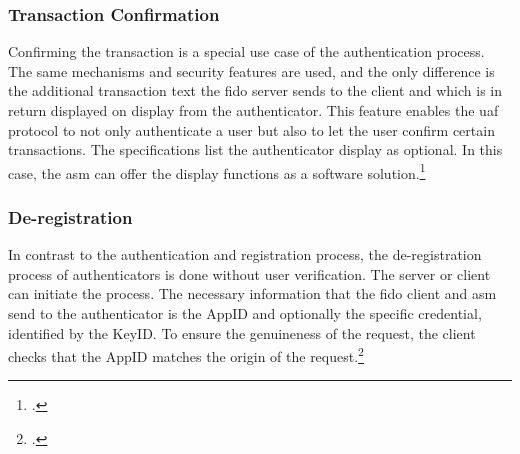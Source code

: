 \subsubsection{Transaction Confirmation}

Confirming the transaction is a special use case of the authentication process. The same mechanisms and security features are used, and the only difference is the additional transaction text the \gls{fido} server sends to the client and which is in return displayed on display from the authenticator. This feature enables the \gls{uaf} protocol to not only authenticate a user but also to let the user confirm certain transactions. The specifications list the authenticator display as optional. In this case, the \gls{asm} can offer the display functions as a software solution.\footcites[See][4]{uaf-overview}[See][251]{Schwartz2018}

\subsubsection{De-registration}

In contrast to the authentication and registration process, the de-registration process of authenticators is done without user verification. The server or client can initiate the process. The necessary information that the \gls{fido} client and \gls{asm} send to the authenticator is the AppID and optionally the specific credential, identified by the KeyID. To ensure the genuineness of the request, the client checks that the AppID matches the origin of the request.\footcites[See][31]{uaf-protocol}[See][7]{uaf-overview}
